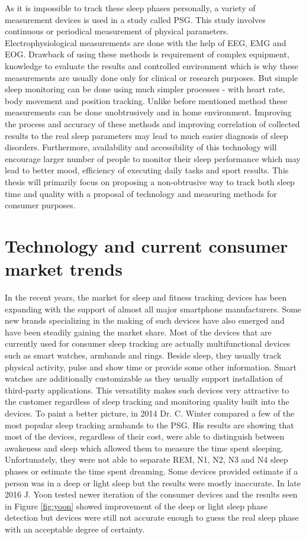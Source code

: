 As it is impossible to track these sleep phases personally, a variety of measurement devices is used in a study called \ac{PSG}. This study involves continuous or periodical measurement of physical parameters. Electrophysiological measurements are done with the help of \ac{EEG}, \ac{EMG} and \ac{EOG}. Drawback of using these methods is requirement of complex equipment, knowledge to evaluate the results and controlled environment which is why these measurements are usually done only for clinical or research purposes. But simple sleep monitoring can be done using much simpler processes - with heart rate, body movement and position tracking. Unlike before mentioned method these measurements can be done unobtrusively and in home environment. Improving the process and accuracy of these methods and improving correlation of collected results to the real sleep parameters may lead to much easier diagnosis of sleep disorders. Furthermore, availability and accessibility of this technology will encourage larger number of people to monitor their sleep performance which may lead to better mood, efficiency of executing daily tasks and sport results. This thesis will primarily focus on proposing a non-obtrusive way to track both sleep time and quality with a proposal of technology and measuring methods for consumer purposes.


\section{Technology and current consumer market trends}

In the recent years, the market for sleep and fitness tracking devices has been expanding with the support of almost all major smartphone manufacturers. Some new brands specializing in the making of such devices have also emerged and have been steadily gaining the market share. Most of the devices that are currently used for consumer sleep tracking are actually multifunctional devices such as smart watches, armbands and rings. Beside sleep, they usually track physical activity, pulse and show time or provide some other information. Smart watches are additionally customizable as they usually support installation of third-party applications. This versatility makes such devices very attractive to the customer regardless of sleep tracking and monitoring quality built into the devices. To paint a better picture, in 2014 Dr. C. Winter compared a few of the most popular sleep tracking armbands to the \ac{PSG}\cite{Winter}. His results are showing that most of the devices, regardless of their cost, were able to distinguish between awakeness and sleep which allowed them to measure the time spent sleeping. Unfortunately, they were not able to separate REM, N1, N2, N3 and N4 sleep phases or estimate the time spent dreaming. Some devices provided estimate if a person was in a deep or light sleep but the results were mostly inaccurate. In late 2016 J. Yoon tested newer iteration of the consumer devices and the results seen in Figure \ref{fig:yoon} showed improvement of the deep or light sleep phase detection but devices were still not accurate enough to guess the real sleep phase with an acceptable degree of certainty\cite{Yoon}.


